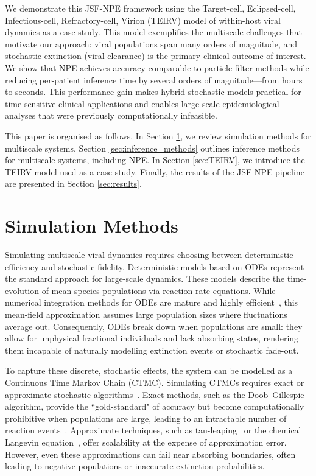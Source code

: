 \documentclass{article}
\begin{document}
We demonstrate this JSF-NPE framework using the Target-cell, Eclipsed-cell, Infectious-cell, Refractory-cell, Virion (TEIRV) model of within-host viral dynamics as a case study. This model exemplifies the multiscale challenges that motivate our approach: viral populations span many orders of magnitude, and stochastic extinction (viral clearance) is the primary clinical outcome of interest. We show that NPE achieves accuracy comparable to particle filter methods while reducing per-patient inference time by several orders of magnitude---from hours to seconds. This performance gain makes hybrid stochastic models practical for time-sensitive clinical applications and enables large-scale epidemiological analyses that were previously computationally infeasible.

This paper is organised as follows. In Section \ref{sec:sim_methods}, we review simulation methods for multiscale systems. Section \ref{sec:inference_methods} outlines inference methods for multiscale systems, including NPE. In Section \ref{sec:TEIRV}, we introduce the TEIRV model used as a case study. Finally, the results of the JSF-NPE pipeline are presented in Section \ref{sec:results}. 

\section{Simulation Methods}\label{sec:sim_methods}


Simulating multiscale viral dynamics requires choosing between deterministic efficiency and stochastic fidelity. Deterministic models based on ODEs represent the standard approach for large-scale dynamics. These models describe the time-evolution of mean species populations via reaction rate equations. While numerical integration methods for ODEs are mature and highly efficient~\cite{griffiths2010numerical}, this mean-field approximation assumes large population sizes where fluctuations average out. Consequently, ODEs break down when populations are small: they allow for unphysical fractional individuals and lack absorbing states, rendering them incapable of naturally modelling extinction events or stochastic fade-out.

To capture these discrete, stochastic effects, the system can be modelled as a Continuous Time Markov Chain (CTMC). Simulating CTMCs requires exact or approximate stochastic algorithms~\cite{Gillespie1976, Sanft2015}. Exact methods, such as the Doob–Gillespie algorithm, provide the ``gold-standard" of accuracy but become computationally prohibitive when populations are large, leading to an intractable number of reaction events~\cite{Sanft2015}. Approximate techniques, such as tau-leaping~\cite{Gillespie2001, Cao2006} or the chemical Langevin equation~\cite{Rao2003, Gillespie2000}, offer scalability at the expense of approximation error. However, even these approximations can fail near absorbing boundaries, often leading to negative populations or inaccurate extinction probabilities.
\end{document}
